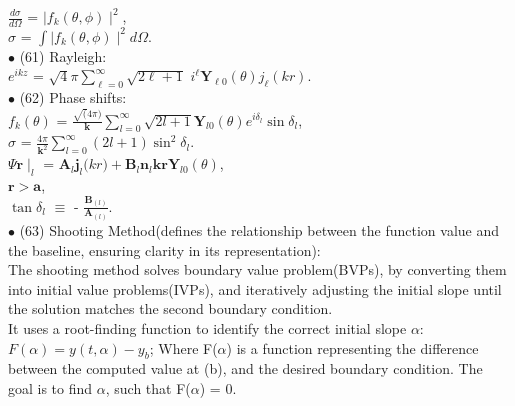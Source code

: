 \documentclass[a4paper, 10pt, onepage]{elegantbook}
\begin{document}
{$\frac{d \sigma}{d \Omega}$ = $\mid f_k(\theta, \phi) \mid^2$,  \\ 

$\sigma$ = $\int \mid f_k(\theta, \phi) \mid^2 d \Omega$.  \\

$\bullet$ (61) Rayleigh:  \\

$e^{ikz}$ = ${\sqrt 4 \pi} \sum_{\ell = 0}^\infty {\sqrt{2 \ell + 1}}$ $i^\ell \mathbf Y_{\ell 0}(\theta) j_\ell(kr)$.  \\

$\bullet$ (62) Phase shifts: \\ 

$f_k(\theta)$ = $\frac{\sqrt(4 \pi)} {\mathbf k} \sum_{l = 0}^\infty \sqrt{2l + 1} \mathbf Y_{l 0}( \theta) e^{i \delta_l} \sin \delta_l$, \\

$\sigma$ = $\frac{4 \pi}{\mathbf k^2} \sum_{l = 0}^\infty(2 l + 1) \sin^2 \delta_{l}$.  \\

$\Psi \mathbf r \mid_l$ = $\mathbf A_{l} \mathbf j_{l} \mathbf(kr) + \mathbf B_{l} \mathbf n_{l} \mathbf{kr} \mathbf Y_{l 0} (\theta)$,  \\  

$\mathbf r > \mathbf a$,  \\

$\tan \delta_{l}$ $\equiv$  - $\frac{\mathbf B_{(l)}}{\mathbf A_{(l)}}$.  \\

$\bullet$ (63) Shooting Method(defines the relationship between the function value and the baseline, ensuring clarity in its representation):  \\

The shooting method solves boundary value problem(BVPs), by converting them into initial value problems(IVPs), and iteratively adjusting the initial slope until the solution matches the second boundary condition. \\

It uses a root-finding function to identify the correct initial slope $\alpha$:  \\

$F(\alpha) = y(t,\alpha) - y_b$; Where F($\alpha$) is a function representing the difference between the computed value at (b), and the desired boundary condition. The goal is to find $\alpha$, such that F($\alpha$) = $0$. \\

}
\end{document}
